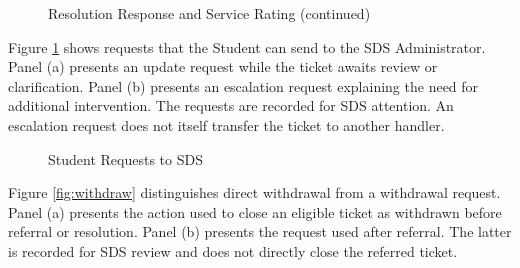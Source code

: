 \begin{figure}[htbp]
    \ContinuedFloat
    \centering
    \begin{minipage}[t]{0.43\linewidth}
        \centering
        \vspace{0pt}
        \par{}\par
    \end{minipage}
    \caption[]{Resolution Response and Service Rating (continued)}
\end{figure}
\FloatBarrier

Figure \ref{fig:sreq} shows requests that the Student can send to the SDS Administrator. Panel (a) presents an update request while the ticket awaits review or clarification. Panel (b) presents an escalation request explaining the need for additional intervention. The requests are recorded for SDS attention. An escalation request does not itself transfer the ticket to another handler.

\renewcommand{\thefigure}{5.12}
\begin{figure}[htbp]
    \centering
    \begin{minipage}[t]{0.43\linewidth}
        \centering
        \vspace{0pt}
        \par{}\par
    \end{minipage}\hspace{0.04\linewidth}
    \begin{minipage}[t]{0.43\linewidth}
        \centering
        \vspace{0pt}
        \par{}\par
    \end{minipage}
    \caption{Student Requests to SDS}
    \label{fig:sreq}
\end{figure}
\FloatBarrier

Figure \ref{fig:withdraw} distinguishes direct withdrawal from a withdrawal request. Panel (a) presents the action used to close an eligible ticket as withdrawn before referral or resolution. Panel (b) presents the request used after referral. The latter is recorded for SDS review and does not directly close the referred ticket.


